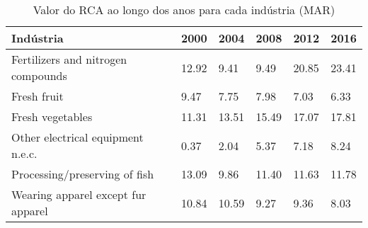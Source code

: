 \begin{table}
\centering
\caption{Valor do RCA ao longo dos anos para cada indústria (MAR)}
\begin{tabular}{p{6cm}p{1.5cm}p{1.5cm}p{1.5cm}p{1.5cm}p{1.5cm}}
\toprule
                         Indústria &  2000 &  2004 &  2008 &  2012 &  2016 \\
\midrule
Fertilizers and nitrogen compounds & 12.92 &  9.41 &  9.49 & 20.85 & 23.41 \\
                       Fresh fruit &  9.47 &  7.75 &  7.98 &  7.03 &  6.33 \\
                  Fresh vegetables & 11.31 & 13.51 & 15.49 & 17.07 & 17.81 \\
 Other electrical equipment n.e.c. &  0.37 &  2.04 &  5.37 &  7.18 &  8.24 \\
     Processing/preserving of fish & 13.09 &  9.86 & 11.40 & 11.63 & 11.78 \\
Wearing apparel except fur apparel & 10.84 & 10.59 &  9.27 &  9.36 &  8.03 \\
\bottomrule
\end{tabular}
\end{table}
